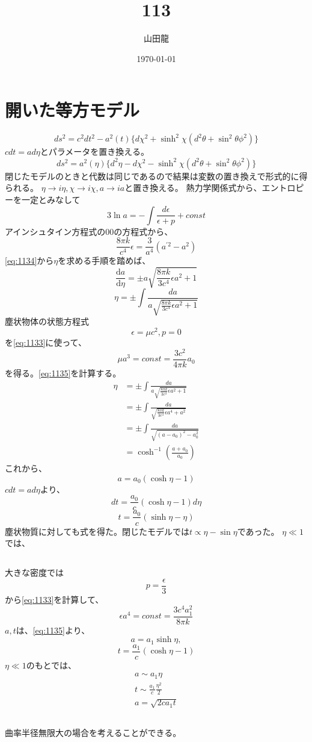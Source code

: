 \documentclass{jsarticle}
\date{\today}
\author{山田龍}
\title{113}
\newcommand{\dder}[2][]{\frac{\mathrm{d}#1}{\mathrm{d}#2}}
\newcommand{\beq}{\begin{equation}}
\newcommand{\eeq}{\end{equation}}
\begin{document}
\maketitle
\section{開いた等方モデル}
\beq
ds^2 = c^2 dt^2 - a^2(t)\{d\chi^2 + \sinh^2\chi(d^2\theta + \sin^2\theta\phi^2)\}
\eeq
$cdt = ad\eta$とパラメータを置き換える。
\beq
    ds^2 = a^2(\eta)\{d^2\eta - d\chi^2 - \sinh^2\chi(d^2\theta + \sin^2\theta\phi^2)\}
\eeq
閉じたモデルのときと代数は同じであるので結果は変数の置き換えで形式的に得られる。
$\eta \rightarrow i \eta, \chi \rightarrow i\chi, a \rightarrow ia$と置き換える。
熱力学関係式から、エントロピーを一定とみなして
\beq\label{eq:1133}
    3\ln a = - \int \frac{d\epsilon}{\epsilon + p} + const
\eeq
アインシュタイン方程式の$00$の方程式から、
\beq\label{eq:1134}
\frac{8\pi k}{c^4} \epsilon = \frac{3}{a^4}(a^{\prime 2} - a^2)
\eeq
\eqref{eq:1134}から$\eta$を求める手順を踏めば、
\beq
    \dder[a]{\eta} = \pm a\sqrt{\frac{8\pi k}{3c^4}\epsilon a^2+1}
\eeq
\beq
    \eta = \pm \int \frac{da}{a\sqrt{\frac{8\pi k}{3c^4}\epsilon a^2 + 1}}
\eeq
塵状物体の状態方程式
\beq\label{eq:1135}
    \epsilon = \mu c^2,p = 0
\eeq
を\eqref{eq:1133}に使って、
\beq
\mu a^3 = const = \frac{3c^2}{4\pi k}a_0
\eeq
を得る。\eqref{eq:1135}を計算する。
\begin{align}
    \eta &= \pm \int \frac{da}{a\sqrt{\frac{8\pi k}{3c^4}\epsilon a^2 + 1}}\\
         &= \pm \int \frac{da}{\sqrt{\frac{8\pi k}{3c^4}\epsilon a^4 + a^2}}\\
         &= \pm \int \frac{da}{\sqrt{(a - a_0)^2 - a_0^2}}\\
         &= \cosh^{-1}(\frac{a+a_0}{a_0})
\end{align}
これから、
\beq
    a = a_0(\cosh \eta - 1)
\eeq
$c dt = a d\eta$より、
\beq
    dt = \frac{a_0}{c}(\cosh\eta - 1)d\eta
\eeq
\beq
    t = \frac{a_0}{c}(\sinh \eta - \eta)
\eeq
塵状物質に対しても式を得た。閉じたモデルでは$t \propto \eta - \sin\eta$であった。
$\eta \ll 1$では、

\subsection{}
大きな密度では
\beq
    p = \frac{\epsilon}{3}
\eeq
から\eqref{eq:1133}を計算して、
\beq
    \epsilon a^4 = const = \frac{3c^4a_1^2}{8\pi k}
\eeq
$a,t$は、\eqref{eq:1135}より、
\beq
    a = a_1 \sinh\eta ,\eeq
\beq
t = \frac{a_1}{c}(\cosh\eta - 1)
\eeq
$\eta \ll 1$のもとでは、
\begin{align}
    a \sim a_1 \eta\\
    t \sim \frac{a_1}{c}\frac{\eta^2}{2}\\
    a = \sqrt{2ca_1t}
\end{align}
\subsection{}
曲率半径無限大の場合を考えることができる。
\beq

\eeq
\end{document}
